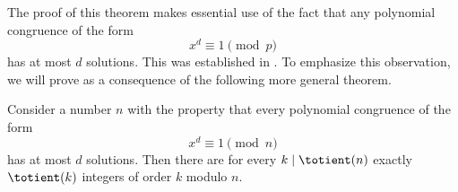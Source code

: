 The proof of this theorem makes essential use of the fact that any polynomial congruence of the form
\begin{equation*}
  x^d\equiv 1\pmod{p}
\end{equation*}
has at most $d$ solutions. This was established in . To emphasize this observation, we will prove  as a consequence of the following more general theorem.

\begin{theorem}\label{theorem:count-integers-of-order}
  Consider a number $n$ with the property that every polynomial congruence of the form
  \begin{equation*}
    x^d\equiv 1\pmod{n}
  \end{equation*}
  has at most $d$ solutions. Then there are for every $k\mid\totient(n)$ exactly $\totient(k)$ integers of order $k$ modulo $n$.
\end{theorem}


